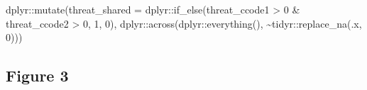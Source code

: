 \documentclass[
  12,
  letterpaper,
  DIV=11,
  numbers=noendperiod]{scrartcl}
\newenvironment{Shaded}{\begin{snugshade}}{\end{snugshade}}
\newcommand{\AttributeTok}[1]{\textcolor[rgb]{0.40,0.45,0.13}{#1}}
\newcommand{\DecValTok}[1]{\textcolor[rgb]{0.68,0.00,0.00}{#1}}
\newcommand{\FunctionTok}[1]{\textcolor[rgb]{0.28,0.35,0.67}{#1}}
\newcommand{\NormalTok}[1]{\textcolor[rgb]{0.00,0.23,0.31}{#1}}
\newcommand{\SpecialCharTok}[1]{\textcolor[rgb]{0.37,0.37,0.37}{#1}}
\begin{document}
\begin{Shaded}
\begin{Highlighting}[numbers=left,,]
\NormalTok{  dplyr}\SpecialCharTok{::}\FunctionTok{mutate}\NormalTok{(}\AttributeTok{threat\_shared =}\NormalTok{ dplyr}\SpecialCharTok{::}\FunctionTok{if\_else}\NormalTok{(threat\_ccode1 }\SpecialCharTok{\textgreater{}} \DecValTok{0} \SpecialCharTok{\&}\NormalTok{ threat\_ccode2 }\SpecialCharTok{\textgreater{}} \DecValTok{0}\NormalTok{, }\DecValTok{1}\NormalTok{, }\DecValTok{0}\NormalTok{),}
\NormalTok{                dplyr}\SpecialCharTok{::}\FunctionTok{across}\NormalTok{(dplyr}\SpecialCharTok{::}\FunctionTok{everything}\NormalTok{(), }\SpecialCharTok{\textasciitilde{}}\NormalTok{tidyr}\SpecialCharTok{::}\FunctionTok{replace\_na}\NormalTok{(.x, }\DecValTok{0}\NormalTok{)))}
\end{Highlighting}
\end{Shaded}

\newpage

\subsection{Figure 3}\label{figure-3}
\end{document}

